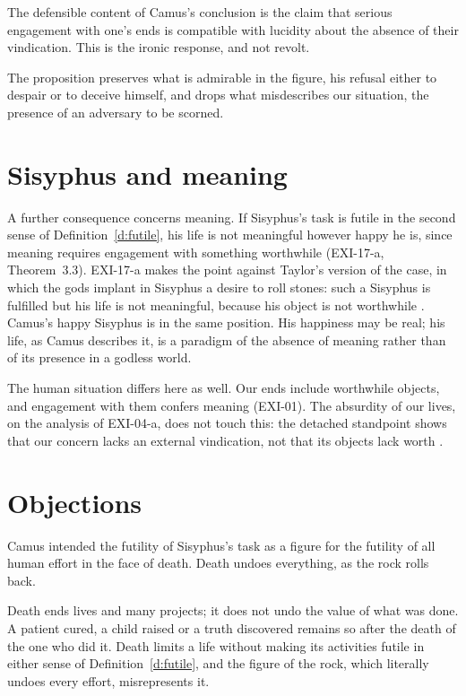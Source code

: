 \documentclass{situationist-preprint}
\begin{document}
\begin{proposition}\label{p:irony}
The defensible content of Camus's conclusion is the claim that serious engagement with one's ends is compatible with lucidity about the absence of their vindication. This is the ironic response, and not revolt.
\end{proposition}

The proposition preserves what is admirable in the figure, his refusal either to despair or to deceive himself, and drops what misdescribes our situation, the presence of an adversary to be scorned.

\section{Sisyphus and meaning}

A further consequence concerns meaning. If Sisyphus's task is futile in the second sense of Definition~\ref{d:futile}, his life is not meaningful however happy he is, since meaning requires engagement with something worthwhile (EXI-17-a, Theorem~3.3). EXI-17-a makes the point against Taylor's version of the case, in which the gods implant in Sisyphus a desire to roll stones: such a Sisyphus is fulfilled but his life is not meaningful, because his object is not worthwhile \citep{Taylor1970}. Camus's happy Sisyphus is in the same position. His happiness may be real; his life, as Camus describes it, is a paradigm of the absence of meaning rather than of its presence in a godless world.

The human situation differs here as well. Our ends include worthwhile objects, and engagement with them confers meaning (EXI-01). The absurdity of our lives, on the analysis of EXI-04-a, does not touch this: the detached standpoint shows that our concern lacks an external vindication, not that its objects lack worth \citep{Wolf2010}.

\section{Objections}

\begin{objection}
Camus intended the futility of Sisyphus's task as a figure for the futility of all human effort in the face of death. Death undoes everything, as the rock rolls back.
\end{objection}

\begin{reply}
Death ends lives and many projects; it does not undo the value of what was done. A patient cured, a child raised or a truth discovered remains so after the death of the one who did it. Death limits a life without making its activities futile in either sense of Definition~\ref{d:futile}, and the figure of the rock, which literally undoes every effort, misrepresents it.
\end{reply}
\end{document}
